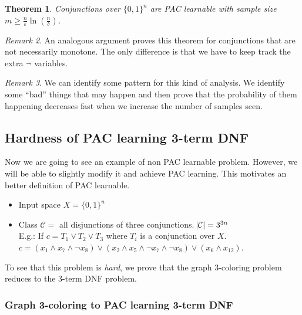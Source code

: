 \documentclass[12pt, letterpaper]{article}
\numberwithin{equation}{section} %
\newcommand{\mc}{\mathcal}
\newcommand{\ve}{\varepsilon}
\newtheorem{theorem}{Theorem}[section]
\theoremstyle{definition}
\theoremstyle{remark}
\newtheorem{remark}[theorem]{Remark}
\begin{document}
\begin{theorem}
    Conjunctions over $\lbrace 0,1 \rbrace^n$ are PAC learnable with sample size  $m \geq \frac n\ve \ln\left(\frac n\delta\right)$.
\end{theorem}

\begin{remark}
    An analogous argument proves this theorem for conjunctions that are not necessarily monotone. 
    The only difference is that we have to keep track the extra $\lnot$ variables.
\end{remark}

\begin{remark}
    We can identify some pattern for this kind of analysis. 
    We identify some ``bad'' things that may happen and then prove that the probability of them happening decreases fast when we increase the number of samples seen.
\end{remark}


\subsection{Hardness of PAC learning 3-term DNF}

Now we are going to see an example of non PAC learnable problem. 
However, we will be able to slightly modify it and achieve PAC learning. 
This motivates an better definition of PAC learnable.
\begin{itemize}
    \item Input space $X = \lbrace 0, 1 \rbrace^n$
    \item Class $\mc C = $ all disjunctions of three conjunctions. $\abs{\mc C} = 3^{3n}$\\
          E.g.: If $c = T_1 \lor T_2 \lor T_3$ where $T_i$ is a conjunction over $X$.\\
          $c = \left(x_1 \wedge x_7 \wedge \lnot x_8 \right) \lor \left(x_2 \wedge x_5 \wedge \lnot x_7 \wedge \lnot x_8\right) \lor \left(x_6 \wedge x_{12}\right)$.
\end{itemize}
To see that this problem is \emph{hard}, we prove that the graph 3-coloring problem reduces to the 3-term DNF problem. 

\subsubsection*{Graph 3-coloring to PAC learning 3-term DNF}
\end{document}
